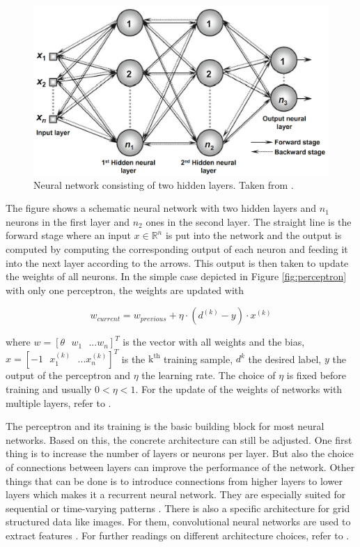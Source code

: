 \begin{figure}[htbp!]
	\centering
	\includegraphics[scale=0.18]{figures/network.png}
	\caption{ Neural network consisting of two hidden layers. Taken from \cite{da2017artificial}. }
	\label{fig:network}
\end{figure}

The figure shows a schematic neural network with two hidden layers and $ n_1 $ neurons in the first layer and $ n_2 $ ones in the second layer. The straight line is the forward stage where an input $ x \in \mathbb{R}^n $ is put into the network and the output is computed by computing the corresponding output of each neuron and feeding it into the next layer according to the arrows. This output is then taken to update the weights of all neurons. In the simple case depicted in Figure \ref{fig:perceptron} with only one perceptron, the weights are updated with  

\begin{equation}
	\label{eq:weights_update}
	w_{current} = w_{previous} + \eta \cdot (d^{(k)} - y) \cdot x^{(k)}
\end{equation}

where $ w = [\theta \text{ } w_1 \text{ } ... w_n]^T $ is the vector with all weights and the bias, $ x = [-1 \text{ } x_1^{(k)} \text{ } ... x_n^{(k)}]^T $ is the $ \text{k}^{\text{th}} $ training sample, $ d^{k} $ the desired label, $ y $ the output of the perceptron and $ \eta $ the learning rate. The choice of $ \eta $ is fixed before training and usually $ 0 < \eta < 1 $. For the update of the weights of networks with multiple layers, refer to \cite{da2017artificial}. 

The perceptron and its training is the basic building block for most neural networks. Based on this, the concrete architecture can still be adjusted. One first thing is to increase the number of layers or neurons per layer. But also the choice of connections between layers can improve the performance of the network. Other things that can be done is to introduce connections from higher layers to lower layers which makes it a recurrent neural network. They are especially suited for sequential or time-varying patterns \cite{medsker2001recurrent}. There is also a specific architecture for grid structured data like images. For them, convolutional neural networks are used to extract features \cite{li2021survey, gu2018recent, o2015introduction}. For further readings on different architecture choices, refer to \cite{liu2017survey}.

